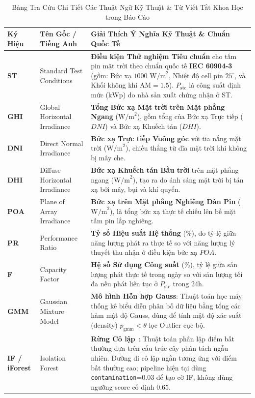 \documentclass[12pt,a4paper]{article}
\begin{document}
\begin{table}[H]
\centering
\caption{Bảng Tra Cứu Chi Tiết Các Thuật Ngữ Kỹ Thuật \& Từ Viết Tắt Khoa Học trong Báo Cáo}
\label{tab:glossary}
\scriptsize
\begin{tabularx}{\linewidth}{|l|l|X|}
\hline
\textbf{Ký Hiệu} & \textbf{Tên Gốc / Tiếng Anh} & \textbf{Giải Thích Ý Nghĩa Kỹ Thuật \& Chuẩn Quốc Tế} \\ \hline
\textbf{ST} & Standard Test Conditions & \textbf{Điều kiện Thử nghiệm Tiêu chuẩn} cho tấm pin mặt trời theo chuẩn quốc tế \textbf{IEC 60904-3}~\cite{iec60904} (gồm: Bức xạ $1000 \text{ W/m}^2$, Nhiệt độ cell pin $25^\circ\text{}$, và Khối không khí $\text{AM} = 1.5$). $P_{\text{stc}}$ là công suất định mức ($\text{kWp}$) do nhà sản xuất chứng nhận ở ST. \\ \hline
\textbf{GHI} & Global Horizontal Irradiance & \textbf{Tổng Bức xạ Mặt trời trên Mặt phẳng Ngang} ($\text{W/m}^2$), gồm tổng của Bức xạ Trực tiếp ($DNI$) và Bức xạ Khuếch tán ($DHI$). \\ \hline
\textbf{DNI} & Direct Normal Irradiance & \textbf{Bức xạ Trực tiếp Vuông góc} với tia nắng mặt trời ($\text{W/m}^2$), chiếu thẳng từ đĩa mặt trời khi không bị mây che. \\ \hline
\textbf{DHI} & Diffuse Horizontal Irradiance & \textbf{Bức xạ Khuếch tán Bầu trời} trên mặt phẳng ngang ($\text{W/m}^2$), tạo ra do ánh sáng mặt trời bị tán xạ bởi mây, bụi và khí quyển. \\ \hline
\textbf{POA} & Plane of Array Irradiance & \textbf{Bức xạ trên Mặt phẳng Nghiêng Dàn Pin} ($\text{W/m}^2$), là tổng bức xạ thực tế chiếu lên bề mặt tấm pin lắp nghiêng. \\ \hline
\textbf{PR} & Performance Ratio & \textbf{Tỷ số Hiệu suất Hệ thống} (\%), đo tỷ lệ giữa năng lượng phát ra thực tế so với năng lượng lý thuyết thu nhận ở điều kiện bức xạ $POA$. \\ \hline
\textbf{F} & Capacity Factor & \textbf{Hệ số Sử dụng Công suất} (\%), tỷ lệ giữa sản lượng phát thực tế trong ngày so với sản lượng tối đa nếu phát liên tục ở $P_{\text{stc}}$ trong 24h. \\ \hline
\textbf{GMM} & Gaussian Mixture Model & \textbf{Mô hình Hỗn hợp Gauss}: Thuật toán học máy thống kê biểu diễn phân bố dữ liệu bằng tổng các hàm mật độ Gauss, dùng để tính mật độ xác suất (density) $p_{\text{gmm}} < \theta$ lọc Outlier cục bộ. \\ \hline
\textbf{IF / iForest} & Isolation Forest & \textbf{Rừng Cô lập}~\cite{liu2008if}: Thuật toán phân lập điểm bất thường dựa trên cấu trúc cây phân tách ngẫu nhiên. Đường đi cô lập ngắn tương ứng với điểm bất thường cao; pipeline hiện tại dùng \texttt{contamination}=0.03 để tạo cờ IF, không dùng ngưỡng score cố định $0.65$. \\ \hline

\end{tabularx}
\end{table}
\end{document}
